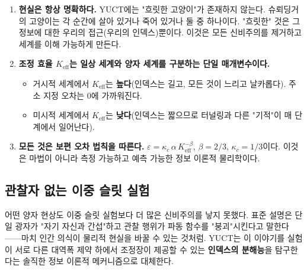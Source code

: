 \documentclass[12pt,a4paper]{article}
\begin{document}
	\begin{enumerate}[leftmargin=*]
		\item \textbf{현실은 항상 명확하다.}
		YUCT에는 "흐릿한 고양이"가 존재하지 않는다. 슈뢰딩거의 고양이는 각 순간에 살아 있거나 죽어 있거나 둘 중 하나이다. "흐릿한" 것은 그 정보에 대한 우리의 접근(우리의 인덱스)뿐이다. 이것은 모든 신비주의를 제거하고 세계를 이해 가능하게 만든다.
		
		\item \textbf{조정 효율 $K_{\mathrm{eff}}$는 일상 세계와 양자 세계를 구분하는 단일 매개변수이다.}
		\begin{itemize}
			\item 거시적 세계에서 $K_{\mathrm{eff}}$는 \textbf{높다}(인덱스는 길고, 모든 것이 느리고 날카롭다). 주소 지정 오차는 0에 가까워진다.
			\item 미시적 세계에서 $K_{\mathrm{eff}}$는 \textbf{낮다}(인덱스는 짧으므로 터널링과 다른 "기적"이 매 단계에서 일어난다).
		\end{itemize}
		
		\item \textbf{모든 것은 보편 오차 법칙을 따른다.}
		$ \varepsilon = \kappa_c \, \alpha \, K_{\mathrm{eff}}^{-\beta} $, $\beta = 2/3$, $\kappa_c = 1/3$이다. 이것은 마법이 아니라 측정 가능하고 예측 가능한 정보 이론적 물리학이다.
	\end{enumerate}
	
	\medskip
	
	\subsection{관찰자 없는 이중 슬릿 실험}
	
	어떤 양자 현상도 이중 슬릿 실험보다 더 많은 신비주의를 낳지 못했다. 표준 설명은 단일 광자가 "자기 자신과 간섭"하고 관찰 행위가 파동 함수를 "붕괴"시킨다고 말한다——마치 인간 의식이 물리적 현실을 바꿀 수 있는 것처럼. YUCT는 이 이야기를 실험이 서로 다른 대역폭 제약 하에서 조정장이 제공할 수 있는 \textbf{인덱스의 분해능}을 탐구한다는 솔직한 정보 이론적 메커니즘으로 대체한다.
	
\end{document}
